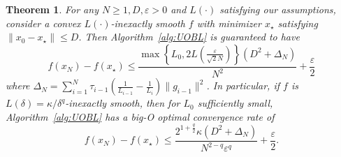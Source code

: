 \documentclass[11pt, hidelinks]{article}
\numberwithin{equation}{section}
\theoremstyle{thmstyletwo}%
\newtheorem{theorem}[thm]{Theorem}
\numberwithin{equation}{section}
\newcommand{\eps}{\varepsilon}
\begin{document}
   
\begin{theorem}\label{thm:UOBL convergence}
    For any $N\geq 1, D,\eps>0$ and $L(\cdot)$ satisfying our assumptions, consider a convex $L(\cdot)$-inexactly smooth $f$ with minimizer $x_\star$ satisfying $\|x_0-x_\star\| \leq D$.  
    Then Algorithm~\ref{alg:UOBL} is guaranteed to have
  $$f(x_N)-f(x_\star)  \leq \frac{\max\left\{L_0, 2L\left(\frac{\eps}{\sqrt{2}N}\right)\right\}(D^2+\Delta_N)}{N^2}+\frac{\eps}{2}$$
    where $\Delta_N = \sum_{i=1}^N {\tau_{i-1}}\left(\frac{1}{L_{i-1}}-\frac{1}{L_i}\right)\|g_{i-1}\|^2$.
    In particular, if $f$ is $L(\delta) = \kappa/\delta^q$-inexactly smooth, then for $L_0$ sufficiently small, Algorithm~\ref{alg:UOBL} has a big-O optimal convergence rate of
    $$f(x_N)-f(x_\star) \leq \frac{2^{1+\frac{q}{2}}\kappa\left(D^2 + \Delta_N\right) }{N^{2-q}\eps^{q}}+\frac{\eps}{2}.  $$
\end{theorem}
\end{document}
